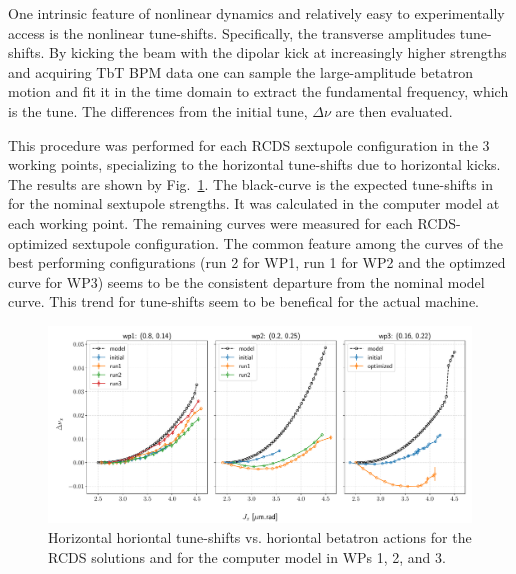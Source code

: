 One intrinsic feature of nonlinear dynamics and relatively easy to experimentally access is the nonlinear tune-shifts. Specifically, the transverse amplitudes tune-shifts. By kicking the beam with the dipolar kick at increasingly higher strengths and acquiring TbT BPM data one can sample the large-amplitude betatron motion and fit it in the time domain to extract the fundamental frequency, which is the tune. The differences from the initial tune, $\Delta\nu$ are then evaluated.

This procedure was performed for each RCDS sextupole configuration in the 3 working points, specializing to the horizontal tune-shifts due to horizontal kicks. The results are shown by Fig.~\ref{fig:adts}. The black-curve is the expected tune-shifts in for the nominal sextupole strengths. It was calculated in the computer model at each working point. The remaining curves were measured for each RCDS-optimized sextupole configuration. The common feature among the curves of the best performing configurations (run 2 for WP1, run 1 for WP2 and the optimzed curve for WP3) seems to be the consistent departure from the nominal model curve. This trend for tune-shifts seem to be benefical for the actual machine.
\begin{figure}
    \includegraphics[width=\columnwidth]{Images/opt_configs_dtunes.pdf}
    \caption{Horizontal horiontal tune-shifts vs. horiontal betatron actions for the RCDS solutions and for the computer model in WPs 1, 2, and 3.}
    \label{fig:adts}
\end{figure}
